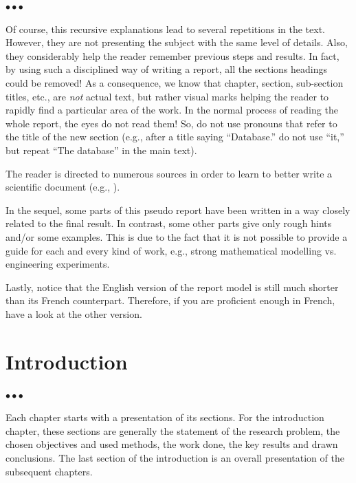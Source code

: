 \documentclass[11pt, english, screen, research-development]{report-rd-info}
\newenvironment{explanation}
{\color{blue}
 \begin{list}{}{\hspace{0.2\textwidth}\color{blue}}\item $\bullet\bullet\bullet$
}
{\end{list}}
\begin{document}
\begin{explanation}
   Of course, this recursive explanations lead to several repetitions in the text.
   However, they are not presenting the subject with the same level of details.
   Also, they considerably help the reader remember previous steps and results.
   In fact, by using such a disciplined way of writing a report, all the sections headings could be removed!  As a consequence, we know that chapter, section, sub-section titles, etc., are \emph{not} actual text, but rather visual marks helping the reader to rapidly find a particular area of the work.
   In the normal process of reading the whole report, the eyes do not read them!  So, do not use pronouns that refer to the title of the new section (e.g., after a title saying ``Database.'' do not use ``it,'' but repeat ``The database'' in the main text).

   The reader is directed to numerous sources in order to learn to better write a scientific document (e.g., \cite{Wolfe}).

   \bigskip

   In the sequel, some parts of this pseudo report have been written in a way closely related to the final result.
   In contrast, some other parts give only rough hints and/or some examples.
   This is due to the fact that it is not possible to provide a guide for each and every kind of work, e.g., strong mathematical modelling vs. engineering experiments.

   \bigskip

   Lastly, notice that the English version of the report model is still much shorter than its French counterpart.
   Therefore, if you are proficient enough in French, have a look at the other version.
\end{explanation}


\chapter{Introduction}

\begin{explanation}
   Each chapter starts with a presentation of its sections.
   For the introduction chapter, these sections are generally the statement of the research problem, the chosen objectives and used methods, the work done, the key results and drawn conclusions.
   The last section of the introduction is an overall presentation of the subsequent chapters.
\end{explanation}
\end{document}

